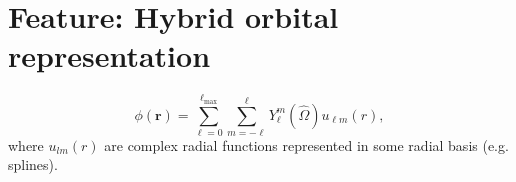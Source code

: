 \newpage
\section{Feature: Hybrid orbital representation}


\renewcommand{\vr}{\mathbf{r}}

\begin{equation}
\phi(\vr) = \sum_{\ell=0}^{\ell_\text{max}} \sum_{m=-\ell}^\ell Y_\ell^m (\hat{\Omega})
u_{\ell m}(r),
\end{equation}
where $u_{lm}(r)$ are complex radial functions represented in some
radial basis (e.g. splines).

